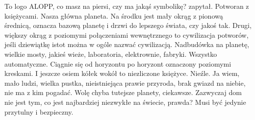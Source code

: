 \begin{dialogue}
\ds{} To logo ALOPP, co masz na piersi, czy ma jakąś symbolikę? \dm{} zapytał.
\ds{} Potworan z księżycami. Nasza główna planeta.
Na środku jest mały okrąg z pionową średnicą, oznacza bazową planetę i drzwi do lepszego świata, czy jakoś tak.
Drugi, większy okrąg z poziomymi połączeniami wewnętrznego to cywilizacja potworów, jeśli dziewiątkę istot można w ogóle nazwać cywilizacją.
Nadbudówka na planetę, wielkie mosty, jakieś wieże, laboratoria, elektrownie, fabryki. Wszystko automatyczne. Ciągnie się od horyzontu po horyzont oznaczony poziomymi kreskami.
I jeszcze osiem kółek wokół to niezliczone księżyce.
\ds{} Nieźle.
\ds{} Ja wiem, mało ludzi, wielka pustka, nieistniejąca prawie przyroda, brak gwiazd na niebie, nie ma z kim pogadać. Wolę chyba tutejsze planety, ciekawsze.
\ds{} Zazwyczaj dom nie jest tym, co jest najbardziej niezwykłe na świecie, prawda? Musi być jedynie przytulny i bezpieczny.
\end{dialogue}

